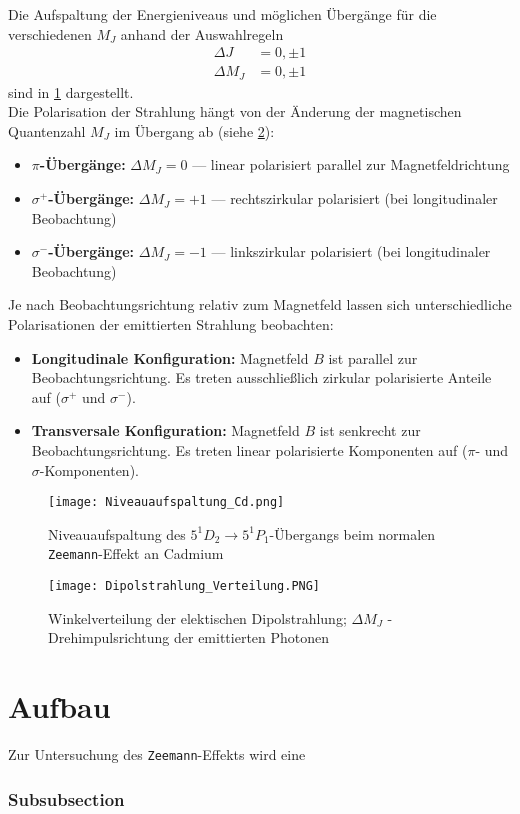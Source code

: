 Die Aufspaltung der Energieniveaus und möglichen Übergänge für die verschiedenen $M_J$ anhand der Auswahlregeln
\begin{align*}
    \Delta J &= 0, \pm 1\\
    \Delta M_J &= 0, \pm 1
\end{align*}
sind in \cref{fig:cd_niveaus} dargestellt.
\vspace{0.3cm}\\
Die Polarisation der Strahlung hängt von der Änderung der magnetischen Quantenzahl $M_J$ im Übergang ab (siehe \cref{fig:polarisation}):
\begin{itemize}
    \item \textbf{$\pi$-Übergänge:} $\Delta M_J = 0$ — linear polarisiert parallel zur Magnetfeldrichtung
    \item \textbf{$\sigma^+$-Übergänge:} $\Delta M_J = +1$ — rechtszirkular polarisiert (bei longitudinaler Beobachtung)
    \item \textbf{$\sigma^-$-Übergänge:} $\Delta M_J = -1$ — linkszirkular polarisiert (bei longitudinaler Beobachtung)
\end{itemize}
Je nach Beobachtungsrichtung relativ zum Magnetfeld lassen sich unterschiedliche Polarisationen der emittierten Strahlung beobachten:
\begin{itemize}
    \item \textbf{Longitudinale Konfiguration:} Magnetfeld $B$ ist parallel zur Beobachtungsrichtung. Es treten ausschließlich zirkular polarisierte Anteile auf ($\sigma^+$ und $\sigma^-$).
    \item \textbf{Transversale Konfiguration:} Magnetfeld $B$ ist senkrecht zur Beobachtungsrichtung. Es treten linear polarisierte Komponenten auf ($\pi$- und $\sigma$-Komponenten).
\end{itemize}
\begin{figure}[h]
    \centering
    \texttt{[image: Niveauaufspaltung\_Cd.png]}
    \caption[Niveauaufspaltung des$5^1D_2 \rightarrow 5^1P_1$-Übergangs bei Cd]{Niveauaufspaltung des $5^1D_2 \rightarrow 5^1P_1$-Übergangs beim normalen \texttt{Zeemann}-Effekt an Cadmium \autocite{LD}}
    \label{fig:cd_niveaus}
\end{figure}
\begin{figure}[h!]
    \centering
    \texttt{[image: Dipolstrahlung\_Verteilung.PNG]}
    \caption[Winkelverteilung der elektischen Dipolstrahlung]{Winkelverteilung der elektischen Dipolstrahlung; $\Delta M_J$ - Drehimpulsrichtung der emittierten Photonen \cite{LD}}
    \label{fig:polarisation}
\end{figure}
%
%
\section{Aufbau}
Zur Untersuchung des \texttt{Zeemann}-Effekts wird eine

\subsubsection{Subsubsection}
